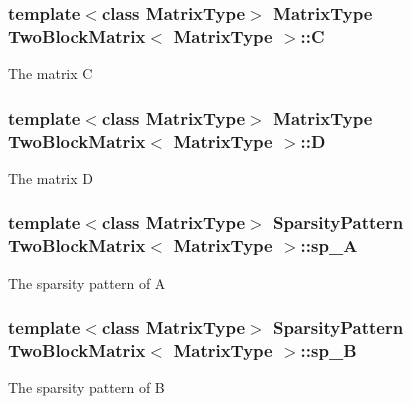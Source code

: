 \subsubsection[{\texorpdfstring{C}{C}}]{\setlength{\rightskip}{0pt plus 5cm}template$<$class Matrix\+Type$>$ Matrix\+Type {\bf Two\+Block\+Matrix}$<$ Matrix\+Type $>$\+::C\hspace{0.3cm}{\ttfamily [protected]}}\hypertarget{class_two_block_matrix_a847505a77448124928540be0367d8747}{}\label{class_two_block_matrix_a847505a77448124928540be0367d8747}
The matrix C 
\subsubsection[{\texorpdfstring{D}{D}}]{\setlength{\rightskip}{0pt plus 5cm}template$<$class Matrix\+Type$>$ Matrix\+Type {\bf Two\+Block\+Matrix}$<$ Matrix\+Type $>$\+::D\hspace{0.3cm}{\ttfamily [protected]}}\hypertarget{class_two_block_matrix_a72c598f36d3e8cce12821a09920ded2d}{}\label{class_two_block_matrix_a72c598f36d3e8cce12821a09920ded2d}
The matrix D 
\subsubsection[{\texorpdfstring{sp\+\_\+A}{sp_A}}]{\setlength{\rightskip}{0pt plus 5cm}template$<$class Matrix\+Type$>$ {\bf Sparsity\+Pattern} {\bf Two\+Block\+Matrix}$<$ Matrix\+Type $>$\+::sp\+\_\+A\hspace{0.3cm}{\ttfamily [protected]}}\hypertarget{class_two_block_matrix_af40216911c197c73687f7d3a1ff4e68e}{}\label{class_two_block_matrix_af40216911c197c73687f7d3a1ff4e68e}
The sparsity pattern of A 
\subsubsection[{\texorpdfstring{sp\+\_\+B}{sp_B}}]{\setlength{\rightskip}{0pt plus 5cm}template$<$class Matrix\+Type$>$ {\bf Sparsity\+Pattern} {\bf Two\+Block\+Matrix}$<$ Matrix\+Type $>$\+::sp\+\_\+B\hspace{0.3cm}{\ttfamily [protected]}}\hypertarget{class_two_block_matrix_a854c7e77623a7c0012aa0ceeb60c147a}{}\label{class_two_block_matrix_a854c7e77623a7c0012aa0ceeb60c147a}
The sparsity pattern of B 
